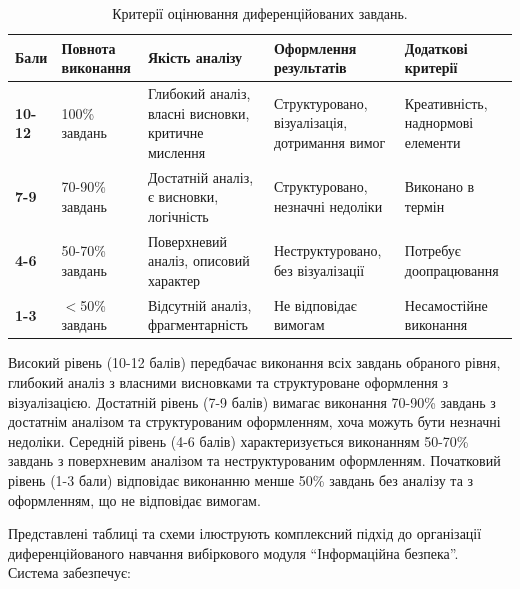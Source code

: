 \begin{table}[h!]
\caption{Критерії оцінювання диференційованих завдань.}
\label{tab:kryterii_otsiniuvannia}
\setlength \tabcolsep {0.5\tabcolsep }

\centering

\begin{tabular}{|m{}|m{}|m{}|m{}|m{}|}
\hline
\textbf{Бали} & 
\textbf{Повнота виконання} & 
\textbf{Якість аналізу} & 
\textbf{Оформлення результатів} & 
\textbf{Додаткові критерії} \\ 
\hline

\textbf{10-12} & 
100\% завдань & 
Глибокий аналіз, власні висновки, критичне мислення & 
Структуровано, візуалізація, дотримання вимог & 
Креативність, наднормові елементи \\ 
\hline

\textbf{7-9} & 
70-90\% завдань & 
Достатній аналіз, є висновки, логічність & 
Структуровано, незначні недоліки & 
Виконано в термін \\ 
\hline

\textbf{4-6} & 
50-70\% завдань & 
Поверхневий аналіз, описовий характер & 
Неструктуровано, без візуалізації & 
Потребує доопрацювання \\ 
\hline

\textbf{1-3} & 
$<$50\% завдань & 
Відсутній аналіз, фрагментарність & 
Не відповідає вимогам & 
Несамостійне виконання \\ 
\hline
\end{tabular}
\end{table}

Високий рівень (10-12 балів) передбачає виконання всіх завдань обраного рівня, глибокий аналіз з власними висновками та структуроване оформлення з візуалізацією. Достатній рівень (7-9 балів) вимагає виконання 70-90\% завдань з достатнім аналізом та структурованим оформленням, хоча можуть бути незначні недоліки. Середній рівень (4-6 балів) характеризується виконанням 50-70\% завдань з поверхневим аналізом та неструктурованим оформленням. Початковий рівень (1-3 бали) відповідає виконанню менше 50\% завдань без аналізу та з оформленням, що не відповідає вимогам.




Представлені таблиці та схеми ілюструють комплексний підхід до організації диференційованого навчання вибіркового модуля ``Інформаційна безпека''. Система забезпечує:

